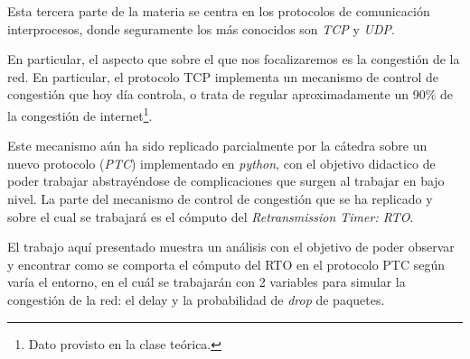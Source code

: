 Esta tercera parte de la materia se centra en los protocolos de comunicaci\'on
interprocesos, donde seguramente los m\'as conocidos son \textit{TCP}\cite{rfc675}
y \textit{UDP}\cite{rfc768}.

\par En particular, el aspecto que sobre el que nos focalizaremos es la
congesti\'on de la red. En particular, el protocolo TCP implementa un mecanismo
de control de congesti\'on\cite{rfc5681} que hoy d\'ia controla, o trata de regular
aproximadamente un 90\% de la congesti\'on de internet\footnote{Dato provisto
en la clase te\'orica.}.

\par Este mecanismo a\'un ha sido replicado parcialmente por la c\'atedra sobre
un nuevo protocolo (\textit{PTC\cite{ptc}}) implementado en \textit{python}\cite{python},
con el objetivo didactico de poder trabajar abstray\'endose de complicaciones que
surgen al trabajar en bajo nivel. La parte del mecanismo de control de congesti\'on
que se ha replicado y sobre el cual se trabajar\'a es el c\'omputo del
\textit{Retransmission Timer: RTO}\cite{rfc6298}.

\par El trabajo aqu\'i presentado muestra un an\'alisis con el objetivo de
poder observar y encontrar como se comporta el c\'omputo del RTO en el protocolo
PTC seg\'un var\'ia el entorno, en el cu\'al se trabajar\'an con 2 variables
para simular la congesti\'on de la red: el delay y la probabilidad de
\textit{drop} de paquetes.
